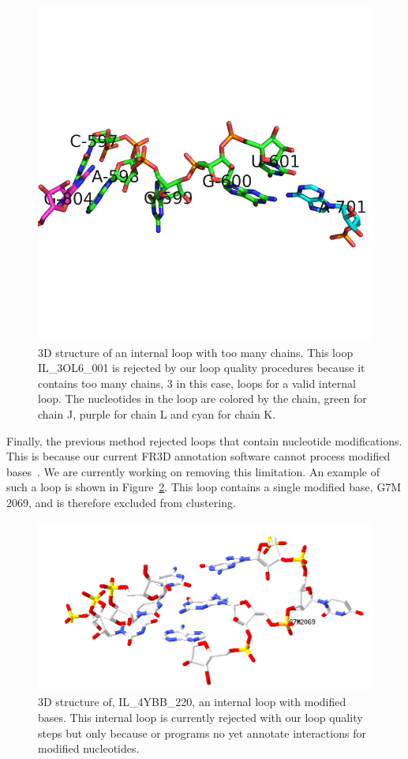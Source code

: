 \begin{figure}
  \includegraphics[width=\textwidth]{chapter-5/figs/loops/IL-3OL6-001}
  \caption{3D structure of an internal loop with too many chains. This loop
    IL\_3OL6\_001 is rejected by our loop quality procedures because it contains
    too many chains, 3 in this case, loops for a valid internal loop. The
  nucleotides in the loop are colored by the chain, green for chain J, purple
for chain L and cyan for chain K.}
\label{fig:too-many-chains}
\end{figure}

Finally, the previous method rejected loops that contain nucleotide
modifications. This is because our current FR3D annotation software cannot
process modified bases~\cite{Sarver2008a}. We are currently working on removing
this limitation. An example of such a loop is shown in
Figure~\ref{fig:modified-loop}. This loop contains a single modified base, G7M
2069, and is therefore excluded from clustering.

\begin{figure}
  \includegraphics[width=\textwidth]{chapter-5/figs/loops/IL-4YBB-220}
  \caption{3D structure of, IL\_4YBB\_220, an internal loop with modified bases.
  This internal loop is currently rejected with our loop quality steps but only
  because or programs no yet annotate interactions for modified nucleotides.}
\label{fig:modified-loop}
\end{figure}


